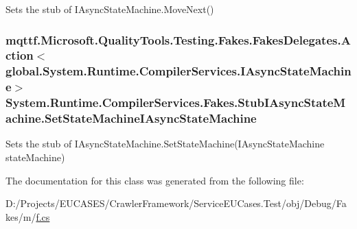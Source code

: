 Sets the stub of I\-Async\-State\-Machine.\-Move\-Next()

\hypertarget{class_system_1_1_runtime_1_1_compiler_services_1_1_fakes_1_1_stub_i_async_state_machine_a9a5c04e1df68ac7c330565198ff205f6}{
\subsubsection[{Set\-State\-Machine\-I\-Async\-State\-Machine}]{\setlength{\rightskip}{0pt plus 5cm}mqttf.\-Microsoft.\-Quality\-Tools.\-Testing.\-Fakes.\-Fakes\-Delegates.\-Action$<$global.\-System.\-Runtime.\-Compiler\-Services.\-I\-Async\-State\-Machine$>$ System.\-Runtime.\-Compiler\-Services.\-Fakes.\-Stub\-I\-Async\-State\-Machine.\-Set\-State\-Machine\-I\-Async\-State\-Machine}}\label{class_system_1_1_runtime_1_1_compiler_services_1_1_fakes_1_1_stub_i_async_state_machine_a9a5c04e1df68ac7c330565198ff205f6}


Sets the stub of I\-Async\-State\-Machine.\-Set\-State\-Machine(\-I\-Async\-State\-Machine state\-Machine)



The documentation for this class was generated from the following file\-:\begin{DoxyCompactItemize}
\item 
D\-:/\-Projects/\-E\-U\-C\-A\-S\-E\-S/\-Crawler\-Framework/\-Service\-E\-U\-Cases.\-Test/obj/\-Debug/\-Fakes/m/\hyperlink{m_2f_8cs}{f.\-cs}\end{DoxyCompactItemize}
